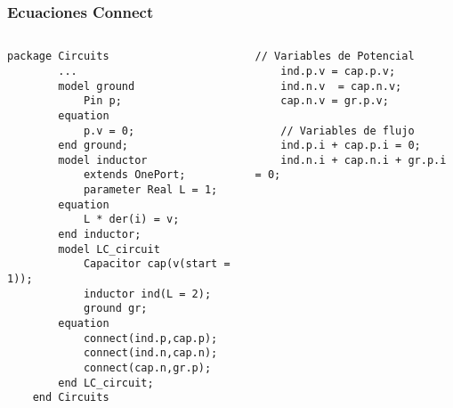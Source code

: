 \documentclass[aspectratio=169,10pt]{beamer}
\begin{document}
\begin{frame}[fragile]
\frametitle{Ecuaciones Connect} 
\begin{columns}  
\column[T]{6cm}
 \begin{lstlisting}[style=base]
	package Circuits
		...
		model ground
			Pin p;
		equation
			p.v = 0;
		end ground;
		model inductor
			extends OnePort;
			parameter Real L = 1;
		equation
			L * der(i) = v;
		end inductor;
		model LC_circuit
			Capacitor cap(v(start = 1));
			inductor ind(L = 2);
			ground gr;
		equation
			connect(ind.p,cap.p);
			connect(ind.n,cap.n);
			connect(cap.n,gr.p);
		end LC_circuit;
	end Circuits
\end{lstlisting}
\column[T]{6cm}
 \begin{lstlisting}[style=base]
	// Variables de Potencial
	ind.p.v = cap.p.v;
	ind.n.v  = cap.n.v;
	cap.n.v = gr.p.v;
	
	// Variables de flujo
	ind.p.i + cap.p.i = 0;
	ind.n.i + cap.n.i + gr.p.i = 0;
\end{lstlisting}
\end{columns}
\end{frame}
\end{document}
